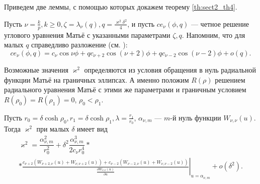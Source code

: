Приведем две леммы, с помощью которых докажем теорему \ref{th:sect2_th4}.
\medskip

Пусть $\nu = \frac{k}{p}, k \geq 0, \zeta = \lambda_\nu(q), q=\frac{\varkappa^2 \delta^2}{4}$, и пусть $ce_\nu(\phi, q)$ --- четное решение углового уравнения Матьё с указанными параметрами $\zeta, q$. Напомним, что для малых $q$ справедливо разложение (см. \cite[\S~2.2, с.~122---124]{wref12}):
$$ce_\nu(\phi, q) = c_\nu \cos{\nu \phi} + q c_{\nu+2} \cos{(\nu+2) \phi} +q c_{\nu-2} \cos{(\nu-2) \phi} + o(q).$$ 

Возможные значения $\varkappa^2$ определяются из условия обращения в нуль радиальной функции Матьё на граничных эллипсах. А именно положим 
$R(\rho)$ решением радиального уравнения Матьё с этими же параметрами и граничным условием $R(\rho_0)=R(\rho_1)=0$, $\rho_0 < \rho_1$. 
\begin{lemma}
Пусть $r_0 = \delta\cosh{\rho_0}, r_1 = \delta\cosh{\rho_1}, \lambda = \frac{r_1}{r_0}$, $\alpha_{\nu, m}$ --- $m$-й нуль функции $W_{\nu, \nu}(u)$. Тогда $\varkappa^2$ при малых $\delta$ имеет вид
\begin{multline*}
\varkappa^2 = \dfrac{\alpha_{\nu, m}^2}{r_0^2} + \delta^2 \dfrac{\alpha_{\nu, m}^3}{2 c_\nu r_0^4} * \\ *\left. \frac{
c_{\nu+2} \left( W_{\nu+2, \nu}(u) + W_{\nu, \nu+2}(u) \right) + 
c_{\nu-2} \left( W_{\nu-2, \nu}(u) + W_{\nu, \nu-2}(u) \right)
}{ \frac{\partial W_{\nu,\nu}(u)}{\partial u} }\right|_{u=\alpha_{\nu, m}} + o(\delta^2).
\end{multline*}
\label{th:ringLemma1}
\end{lemma}

